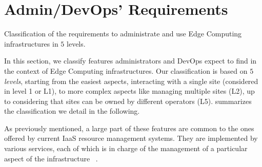 
\section{Admin/DevOps' Requirements}
\label{sec:requirements}

%   

\begin{table*}
    \centering
        
    \caption{Classification of the requirements to administrate and use Edge
    Computing infrastructures in $5$ levels.}
    \label{tab:requirements}
\end{table*}

In this section, we classify features administrators and DevOps expect
to find in the context of Edge Computing infrastructures.
Our classification is based on $5$ \emph{levels}, starting from the easiest
aspects, \ie interacting with a single site (considered in level 1 or L1), to
more complex aspects like managing multiple sites (L2), up to considering that
sites can be owned by different operators (L5).
 summarizes the classification we detail in the following.

As previously mentioned, a large part of these features are common to
the ones offered by current IaaS resource management systems. They are
implemented by various services, each of which is in charge of the
management of a particular aspect of the infrastructure
~\cite{moreno2012csp}.

